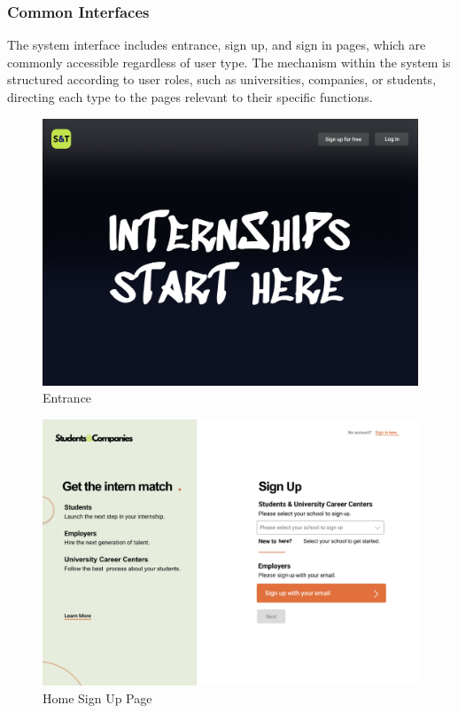 \documentclass[a4paper,12pt]{article}
\begin{document}
\subsubsection*{Common Interfaces}
The system interface includes entrance, sign up, and sign in pages, which are commonly accessible regardless of user type. The mechanism within the system is structured according to user roles, such as universities, companies, or students, directing each type to the pages relevant to their specific functions.
\begin{figure}[H]
    \centering
    \includegraphics[scale = 0.40]{figures/UserInterfaces/General/Entrance.png}
    \caption{Entrance}
    \centering
\end{figure}
\begin{figure}[H]
    \centering
    \includegraphics[scale = 0.40]{figures/UserInterfaces/General/HomeSignUp.png}
    \caption{Home Sign Up Page}
    \centering
\end{figure}
\end{document}
